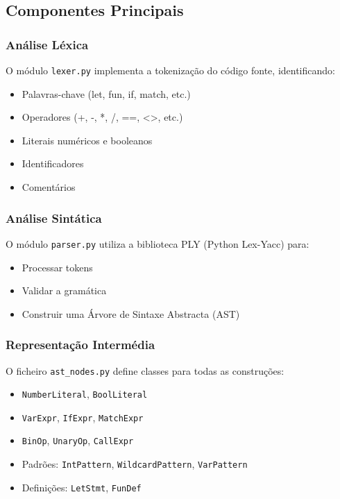 \documentclass[11pt,a4paper]{report}
\begin{document}
\subsection{Componentes Principais}

\subsubsection{Análise Léxica}
O módulo \texttt{lexer.py} implementa a tokenização do código fonte, identificando:
\begin{itemize}
    \item Palavras-chave (let, fun, if, match, etc.)
    \item Operadores (+, -, *, /, ==, <>, etc.)
    \item Literais numéricos e booleanos
    \item Identificadores
    \item Comentários


\end{itemize}

\subsubsection{Análise Sintática}
O módulo \texttt{parser.py} utiliza a biblioteca PLY (Python Lex-Yacc) para:
\begin{itemize}
    \item Processar tokens
    \item Validar a gramática
    \item Construir uma Árvore de Sintaxe Abstracta (AST)
\end{itemize}

\subsubsection{Representação Intermédia}
O ficheiro \texttt{ast\_nodes.py} define classes para todas as construções:
\begin{itemize}
    \item \texttt{NumberLiteral}, \texttt{BoolLiteral}
    \item \texttt{VarExpr}, \texttt{IfExpr}, \texttt{MatchExpr}
    \item \texttt{BinOp}, \texttt{UnaryOp}, \texttt{CallExpr}
    \item Padrões: \texttt{IntPattern}, \texttt{WildcardPattern}, \texttt{VarPattern}
    \item Definições: \texttt{LetStmt}, \texttt{FunDef}
\end{itemize}
\end{document}
